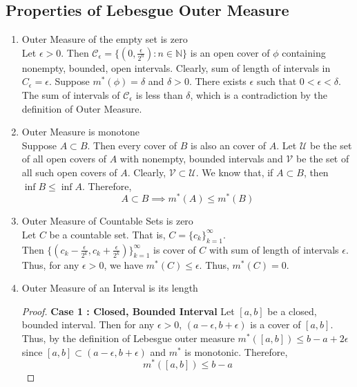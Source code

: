 \subsection{Properties of Lebesgue Outer Measure}
\begin{enumerate}
	\item Outer Measure of the empty set is zero\\
	Let $\epsilon > 0$.
	Then $\mathcal{C}_\epsilon = \{ (0,\frac{\epsilon}{2^n}) : n \in \mathbb{N} \}$ is an open cover of $\phi$ containing nonempty, bounded, open intervals.
	Clearly, sum of length of intervals in $C_\epsilon = \epsilon$.
	Suppose $m^\ast(\phi) = \delta$ and $\delta > 0$.
	There exists $\epsilon$ such that $0 < \epsilon < \delta$.
	The sum of intervals of $\mathcal{C}_\epsilon$ is less than $\delta$, which is a contradiction by the definition of Outer Measure.
	\item Outer Measure is monotone\\
	Suppose $A \subset B$.
	Then every cover of $B$ is also an  cover of $A$.
	Let $\mathcal{U}$ be the set of all open covers of $A$ with nonempty, bounded intervals and $\mathcal{V}$ be the set of all such open covers of $A$.
	Clearly, $\mathcal{V} \subset \mathcal{U}$.
	We know that, if $A \subset B$, then $\inf{B} \le \inf{A}$.
	Therefore,
	\begin{equation}
		A \subset B \implies m^\ast(A) \le m^\ast(B)
	\end{equation}
	\item Outer Measure of Countable Sets is zero\\
	Let $C$ be a countable set.
	That is, $C = \{ c_k \}_{k=1}^\infty$.\\
	Then $\{ (c_k-\frac{\epsilon}{2^k}, c_k + \frac{\epsilon}{2^k}) \}_{k=1}^\infty$ is cover of $C$ with sum of length of intervals $\epsilon$.
	Thus, for any $\epsilon > 0$, we have $m^\ast(C) \le \epsilon$.
	Thus, $m^\ast(C) = 0$.
	\item Outer Measure of an Interval is its length
	\begin{proof}
		\textbf{Case 1 : Closed, Bounded Interval}
		Let $[a,b]$ be a closed, bounded interval.
		Then for any $\epsilon > 0$, $(a-\epsilon,b+\epsilon)$ is a cover of $[a,b]$.
		Thus, by the definition of Lebesgue outer measure $m^\ast([a,b]) \le b-a+2\epsilon$ since $[a,b] \subset (a-\epsilon,b+\epsilon)$ and $m^\ast$ is monotonic.
		Therefore,
	\begin{equation}
		m^\ast([a,b]) \le b-a
	\end{equation}


\end{proof}
\end{enumerate}
